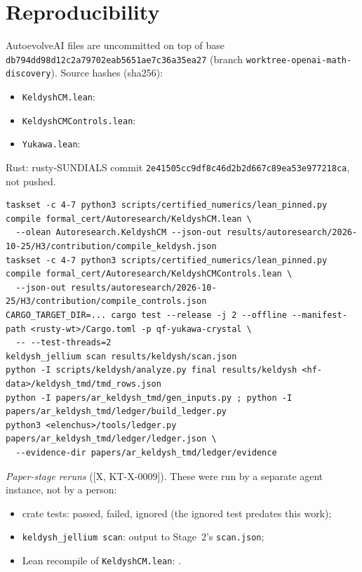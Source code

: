\documentclass[11pt]{article}
\theoremstyle{remark}
\newcommand{\tier}[1]{\textsf{[#1]}}
\begin{document}
\section{Reproducibility}\label{sec:repro}
AutoevolveAI files are uncommitted on top of base \texttt{db794dd98d12c2a79702eab5651ae7c36a35ea27} (branch
\texttt{worktree-openai-math-discovery}). Source hashes (sha256):
\begin{itemize}\small
\item \texttt{KeldyshCM.lean}:\newline\texttt{\KTShaKeldysh}
\item \texttt{KeldyshCMControls.lean}:\newline\texttt{\KTShaControls}
\item \texttt{Yukawa.lean}:\newline\texttt{\KTShaYukawa}
\end{itemize}
Rust: rusty-SUNDIALS commit \texttt{2e41505cc9df8c46d2b2d667c89ea53e977218ca}, not pushed.
\begin{lstlisting}[basicstyle=\ttfamily\scriptsize]
taskset -c 4-7 python3 scripts/certified_numerics/lean_pinned.py compile formal_cert/Autoresearch/KeldyshCM.lean \
  --olean Autoresearch.KeldyshCM --json-out results/autoresearch/2026-10-25/H3/contribution/compile_keldysh.json
taskset -c 4-7 python3 scripts/certified_numerics/lean_pinned.py compile formal_cert/Autoresearch/KeldyshCMControls.lean \
  --json-out results/autoresearch/2026-10-25/H3/contribution/compile_controls.json
CARGO_TARGET_DIR=... cargo test --release -j 2 --offline --manifest-path <rusty-wt>/Cargo.toml -p qf-yukawa-crystal \
  -- --test-threads=2
keldysh_jellium scan results/keldysh/scan.json
python -I scripts/keldysh/analyze.py final results/keldysh <hf-data>/keldysh_tmd/tmd_rows.json
python -I papers/ar_keldysh_tmd/gen_inputs.py ; python -I papers/ar_keldysh_tmd/ledger/build_ledger.py
python3 <elenchus>/tools/ledger.py papers/ar_keldysh_tmd/ledger/ledger.json \
  --evidence-dir papers/ar_keldysh_tmd/ledger/evidence
\end{lstlisting}
\emph{Paper-stage reruns} (\tier{X, KT-X-0009}). These were run by a separate agent instance, not by a person:
\begin{itemize}
\item crate tests: \KTTestsPassed{} passed, \KTTestsFailed{} failed, \KTTestsIgnored{} ignored (the ignored test
predates this work);
\item \texttt{keldysh\_jellium scan}: output \KTScanSame{} to Stage~2's \texttt{scan.json};
\item Lean recompile of \texttt{KeldyshCM.lean}: \KTRecompileStatus.
\end{itemize}
\end{document}
